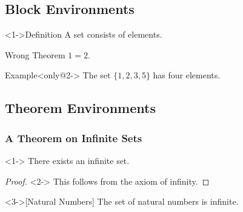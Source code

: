   \subsection{Block Environments}
  \begin{frame}
  \begin{block}<1->{Definition}
  A \alert{set} consists of elements.
  \end{block}
  \begin{alertblock}{Wrong Theorem}
  $1=2$.
  \end{alertblock}
  \begin{exampleblock}{Example}<only@2->
  The set $\{1,2,3,5\}$ has four elements.
  \end{exampleblock}
  \end{frame}
  \subsection{Theorem Environments}
  \begin{frame}
  \frametitle{A Theorem on Infinite Sets}
  \begin{theorem}<1->
  There exists an infinite set.
  \end{theorem}
  \begin{proof}<2->
  This follows from the axiom of infinity.
  \end{proof}
  \begin{example}<3->[Natural Numbers]
  The set of natural numbers is infinite.
  \end{example}
  \end{frame}
